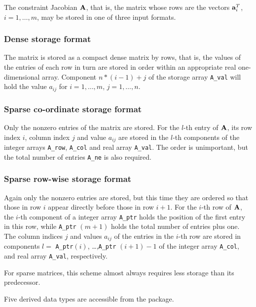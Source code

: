 \documentclass{galahad}
\begin{document}

\galmatrix
The constraint Jacobian ${\mathbf{A}}$, that is, the matrix
whose rows are the vectors ${\mathbf{a}}_{i}^{T}$, $i = 1, \ldots , m$,
may be stored in one of three input formats.

\subsubsection{Dense storage format}\label{dense}
The matrix is stored as a compact
dense matrix by rows, that is, the values of the entries of each row in turn are
stored in order within an appropriate real one-dimensional array.
Component $n \ast (i-1) + j$ of the storage array {\tt A\_val} will hold the
value $a_{ij}$ for $i = 1, \ldots , m$, $j = 1, \ldots , n$.

\subsubsection{Sparse co-ordinate storage format}\label{coordinate}
Only the nonzero entries of the matrix are stored. For the
$l$-th entry of ${\mathbf{A}}$, its row index $i$, column index $j$
and value $a_{ij}$
are stored in the $l$-th components of the integer arrays {\tt A\_row},
{\tt A\_col} and real array {\tt A\_val}.
The order is unimportant, but the total
number of entries {\tt A\_ne} is also required.

\subsubsection{Sparse row-wise storage format}\label{rowwise}
Again only the nonzero entries are stored, but this time
they are ordered so that those in row $i$ appear directly before those
in row $i+1$. For the $i$-th row of ${\mathbf{A}}$, the $i$-th component of a
integer array {\tt A\_ptr} holds the position of the first entry in this row,
while {\tt A\_ptr} $(m+1)$ holds the total number of entries plus one.
The column indices $j$ and values $a_{ij}$ of the entries in the $i$-th row
are stored in components
$l =$ {\tt A\_ptr}$(i)$, \ldots ,{\tt A\_ptr} $(i+1)-1$ of the
integer array {\tt A\_col}, and real array {\tt A\_val}, respectively.

For sparse matrices, this scheme almost always requires less storage than
its predecessor.


\galtypes
Five derived data types are accessible from the package.
\end{document}
